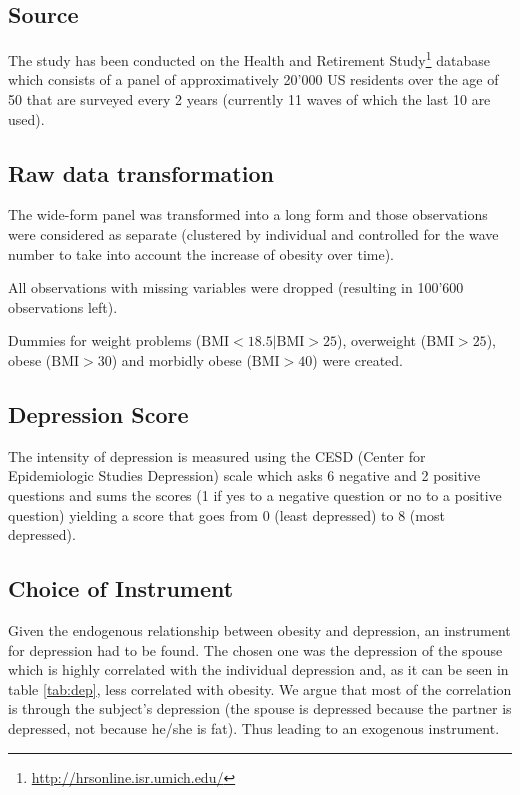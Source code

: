 
\subsection{Source}
The study has been conducted on the Health and Retirement Study\footnote{\url{http://hrsonline.isr.umich.edu/}} database which consists of a panel of approximatively 20'000 US residents over the age of 50 that are surveyed every 2 years (currently 11 waves of which the last 10 are used). 

\subsection{Raw data transformation}
The wide-form panel was transformed into a long form and those observations were considered as separate (clustered by individual and controlled for the wave number to take into account the increase of obesity over time).

All observations with missing variables were dropped (resulting in 100'600 observations left).
 
Dummies for weight problems ($ \text{BMI} < 18.5 | \text{BMI} > 25$), overweight ($\text{BMI} > 25$), obese ($\text{BMI} > 30$) and morbidly obese ($\text{BMI} > 40$) were created.

\subsection{Depression Score}

The intensity of depression is measured using the CESD (Center for Epidemiologic Studies Depression) scale which asks 6 negative and 2 positive questions and sums the scores (1 if yes to a negative question or no to a positive question) yielding a score that goes from 0 (least depressed) to 8 (most depressed).

\subsection{Choice of Instrument}
Given the endogenous relationship between obesity and depression, an instrument for depression had to be found. The chosen one was the depression of the spouse which is highly correlated with the individual depression and, as it can be seen in table \ref{tab:dep}, less correlated with obesity. We argue that most of the correlation is through the subject's depression (the spouse is depressed because the partner is depressed, not because he/she is fat). Thus leading to an exogenous instrument.


